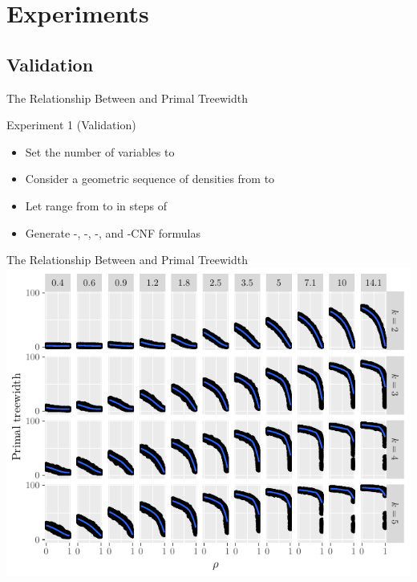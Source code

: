\documentclass{beamer}
\begin{document}
\section{Experiments}

\subsection{Validation}

\begin{frame}{The Relationship Between \structure{$\rho$} and Primal Treewidth}
  \begin{block}{Experiment 1 (Validation)}
    \begin{itemize}
      \item Set the number of variables to 
      \item Consider a geometric sequence of  densities from
             to 
      \item Let \structure{$\rho$} range from  to
             in steps of 
      \item Generate  -, -,
            -, and -CNF formulas
    \end{itemize}
  \end{block}
\end{frame}

\begin{frame}{The Relationship Between \structure{$\rho$} and Primal Treewidth}
  \includegraphics{regular_repetitiveness.pdf}
\end{frame}
\end{document}
